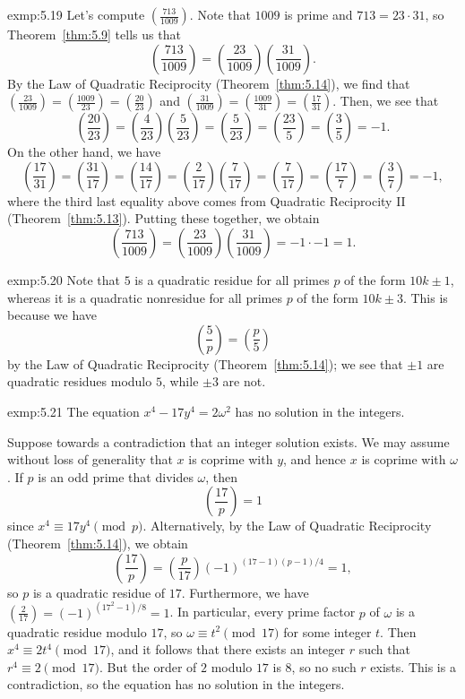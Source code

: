 \begin{exmp}{exmp:5.19}
    Let's compute $(\frac{713}{1009})$. Note that $1009$ is prime and $713 
    = 23 \cdot 31$, so Theorem~\ref{thm:5.9} tells us that 
    \[ \left( \frac{713}{1009} \right) = \left( \frac{23}{1009} \right) 
    \left( \frac{31}{1009} \right). \] 
    By the Law of Quadratic Reciprocity (Theorem~\ref{thm:5.14}), we find that 
    $(\frac{23}{1009}) = (\frac{1009}{23}) = (\frac{20}{23})$ and 
    $(\frac{31}{1009}) = (\frac{1009}{31}) = (\frac{17}{31})$. Then, we see that 
    \[ \left( \frac{20}{23} \right) = \left( \frac{4}{23} \right) 
    \left( \frac{5}{23} \right) = \left( \frac{5}{23} \right) = 
    \left( \frac{23}{5} \right) = \left( \frac{3}{5} \right) = -1. \] 
    On the other hand, we have 
    \[ \left( \frac{17}{31} \right) = \left( \frac{31}{17} \right) = 
    \left( \frac{14}{17} \right) = \left( \frac{2}{17} \right) 
    \left( \frac{7}{17} \right) = \left( \frac{7}{17} \right) = 
    \left( \frac{17}{7} \right) = \left( \frac{3}{7} \right) = -1, \] 
    where the third last equality above comes from Quadratic Reciprocity II 
    (Theorem~\ref{thm:5.13}). Putting these together, we obtain 
    \[ \left( \frac{713}{1009} \right) = \left( \frac{23}{1009} \right) 
    \left( \frac{31}{1009} \right) = -1 \cdot -1 = 1. \] 
\end{exmp}

\begin{exmp}{exmp:5.20}
    Note that $5$ is a quadratic residue for all primes $p$ of the form $10k \pm 1$, 
    whereas it is a quadratic nonresidue for all primes $p$ of the form $10k \pm 3$. 
    This is because we have 
    \[ \left( \frac{5}{p} \right) = \left( \frac{p}{5} \right) \] 
    by the Law of Quadratic Reciprocity (Theorem~\ref{thm:5.14}); we see that 
    $\pm1$ are quadratic residues modulo $5$, while $\pm3$ are not. 
\end{exmp}

\begin{exmp}{exmp:5.21}
    The equation $x^4 - 17y^4 = 2\omega^2$ has no solution in the integers. 

    Suppose towards a contradiction that an integer solution exists. We may 
    assume without loss of generality that $x$ is coprime with $y$, and hence 
    $x$ is coprime with $\omega$. If $p$ is an odd prime that divides $\omega$, then 
    \[ \left( \frac{17}{p} \right) = 1 \] 
    since $x^4 \equiv 17y^4 \pmod p$. Alternatively, by the Law of Quadratic 
    Reciprocity (Theorem~\ref{thm:5.14}), we obtain 
    \[ \left( \frac{17}{p} \right) = \left( \frac{p}{17} \right) 
    (-1)^{(17-1)(p-1)/4} = 1, \] 
    so $p$ is a quadratic residue of $17$. Furthermore, we have $(\frac{2}{17}) 
    = (-1)^{(17^2-1)/8} = 1$. In particular, every prime factor $p$ of 
    $\omega$ is a quadratic residue modulo $17$, so $\omega \equiv t^2 \pmod{17}$ 
    for some integer $t$. Then $x^4 \equiv 2t^4 \pmod{17}$, and it follows that 
    there exists an integer $r$ such that $r^4 \equiv 2 \pmod{17}$. But the 
    order of $2$ modulo $17$ is $8$, so no such $r$ exists. This is a contradiction, 
    so the equation has no solution in the integers. 
\end{exmp}

